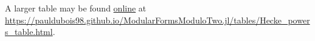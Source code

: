 A larger table may be found \href{https://pauldubois98.github.io/ModularFormsModuloTwo.jl/tables/Hecke_powers_table.html}{online} at \url{https://pauldubois98.github.io/ModularFormsModuloTwo.jl/tables/Hecke_powers_table.html}.





